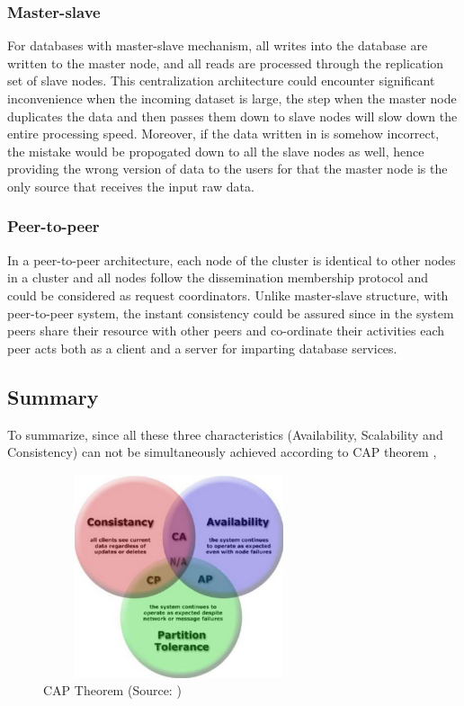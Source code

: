 \subsubsection{Master-slave}\mbox{}

For databases with master-slave mechanism, all writes into the database are written to the master node, and all reads are processed through the replication set of slave nodes. This centralization architecture could encounter significant inconvenience when the incoming dataset is large, the step when the master node duplicates the data and then passes them down to slave nodes will slow down the entire processing speed. Moreover, if the data written in is somehow incorrect, the mistake would be propogated down to all the slave nodes as well, hence providing the wrong version of data to the users for that the master node is the only source that receives the input raw data.

\subsubsection{Peer-to-peer}\mbox{}

In a peer-to-peer architecture, each node of the cluster is identical to other nodes in a cluster and all nodes follow the dissemination membership protocol and could be considered as request coordinators. Unlike master-slave structure, with peer-to-peer system, the instant consistency could be assured since in the system peers share their resource with other peers and co-ordinate their activities each peer acts both as a client and a server for imparting database services\cite{tutorial}.



\subsection{Summary}
To summarize, since all these three characteristics (Availability, Scalability and Consistency) can not be simultaneously achieved according to CAP theorem \cite{neo}, 

\begin{figure}[H]
	\includegraphics[height=6cm, width=8cm]{../../images/cap.png}
	\caption{CAP Theorem (Source: \cite{neo})}
\end{figure}

